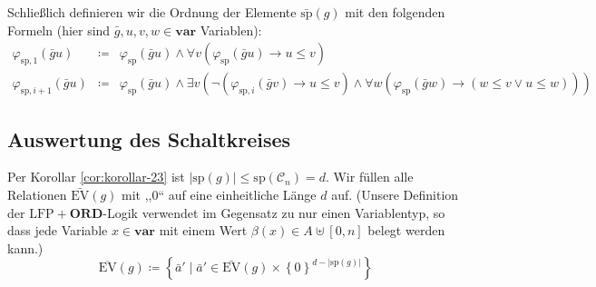 Schließlich definieren wir die Ordnung der Elemente $\bar{\mathrm{sp}}\left(g\right)$
mit den folgenden Formeln (hier sind $\bar{g},u,v,w\in\mathbf{var}$
Variablen):
\begin{eqnarray*}
\varphi_{\mathrm{sp},1}\left(\bar{g}u\right) & \coloneqq & \varphi_{\mathrm{sp}}\left(\bar{g}u\right)\wedge\forall v\left(\varphi_{\mathrm{sp}}\left(\bar{g}u\right)\rightarrow u\leqslant v\right)\\
\varphi_{\mathrm{sp},i+1}\left(\bar{g}u\right) & \coloneqq & \varphi_{\mathrm{sp}}\left(\bar{g}u\right)\wedge\exists v\left(\neg\left(\varphi_{\mathrm{sp},i}\left(\bar{g}v\right)\rightarrow u\leqslant v\right)\wedge\forall w\left(\varphi_{\mathrm{sp}}\left(\bar{g}w\right)\rightarrow\left(w\leqslant v\vee u\leqslant w\right)\right)\right)
\end{eqnarray*}


\subsection{\label{subsec:circuit-eval}Auswertung des Schaltkreises}

Per Korollar \ref{cor:korollar-23} ist $\left|\mathrm{sp}\left(g\right)\right|\leqslant\mathrm{sp}\left(\mathcal{C}_{n}\right)=d$.
Wir füllen alle Relationen $\bar{\mathrm{EV}}\left(g\right)$ mit
,,$0$`` auf eine einheitliche Länge $d$ auf. (Unsere Definition
der $\mathrm{LFP}+\mathbf{ORD}$-Logik verwendet im Gegensatz zu \cite{AD2014}
nur einen Variablentyp, so dass jede Variable $x\in\mathbf{var}$
mit einem Wert $\beta\left(x\right)\in A\uplus\left[0,n\right]$ belegt
werden kann.) 
\[
\overline{\mathrm{EV}}\left(g\right)\coloneqq\left\{ \bar{a}'\mid\bar{a}'\in\bar{\mathrm{EV}}\left(g\right)\times\left\{ 0\right\} ^{d-\left|\mathrm{sp}\left(g\right)\right|}\right\} 
\]

